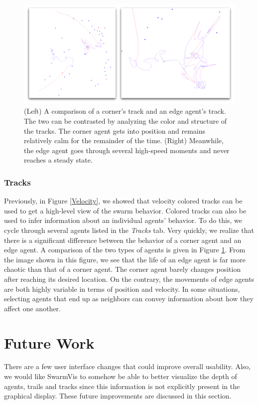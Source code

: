 \documentclass[conference]{IEEEtran}
\begin{document}
\begin{figure}
\centering
\includegraphics[scale=.27]{images/cornervsedge.pdf}
\caption{
(Left) A comparison of a corner's track and an edge agent's track.
The two can be contrasted by analyzing the color and structure of the tracks.
The corner agent gets into position and remains relatively calm for the remainder of the time.
(Right) Meanwhile, the edge agent goes through several high-speed moments and never reaches a steady state.
}
\label{CornerAndEdge}
\end{figure}

\subsubsection{Tracks}
Previously, in Figure \ref{Velocity}, we showed that velocity colored tracks can be used to get a high-level view of the swarm behavior.
Colored tracks can also be used to infer information about an individual agents' behavior.
To do this, we cycle through several agents listed in the \textit{Tracks} tab.
Very quickly, we realize that there is a significant difference between the behavior of a corner agent and an edge agent.
A comparison of the two types of agents is given in Figure \ref{CornerAndEdge}.
From the image shown in this figure, we see that the life of an edge agent is far more chaotic than that of a corner agent.
The corner agent barely changes position after reaching its desired location. On the contrary, the movements of edge agents are both highly variable in terms of position and velocity.
In some situations, selecting agents that end up as neighbors can convey information about how they affect one another.





\section{Future Work}
There are a few user interface changes that could improve overall usability.
Also, we would like SwarmVis to somehow be able to better visualize the depth of
agents, trails and tracks since this information is not explicitly present in the graphical display.
These future improvements are discussed in this section.
\end{document}
